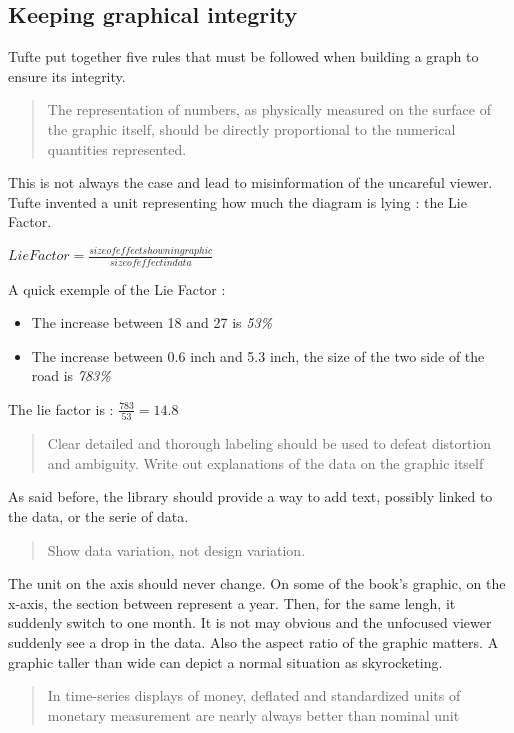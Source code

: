 \subsection{Keeping graphical integrity} 
Tufte put together five rules that must be followed when building a graph to ensure its integrity.

\begin{quote}
The representation of numbers, as physically measured on the surface of the graphic itself, should be directly proportional to the numerical quantities represented.
\end{quote}
This is not always the case and lead to misinformation of the uncareful viewer. Tufte invented a unit representing how much the diagram is lying : the Lie Factor.

$Lie Factor = \frac{size of effect shown in graphic}{size of effect in data}$

A quick exemple of the Lie Factor :


\begin{itemize}
\item The increase between 18 and 27 is \emph{53\%}
\item The increase between 0.6 inch and 5.3 inch, the size of the two side of the road is \emph{783\%}
\end{itemize}

The lie factor is  : $\frac{783}{53} = 14.8$ 

\begin{quote}
Clear detailed and thorough labeling should be used to defeat distortion and ambiguity. Write out explanations of the data on the graphic itself
\end{quote}

As said before, the library should provide a way to add text, possibly linked to the data, or the serie of data.
\begin{quote}
Show data variation, not design variation.
\end{quote}
The unit on the axis should never change. On some of the book's graphic, on the x-axis, the section between represent a year.
Then, for the same lengh, it suddenly switch to one month. It is not may obvious and the unfocused viewer suddenly see a drop in the data. 
Also the aspect ratio of the graphic matters. A graphic taller than wide can depict a normal situation as skyrocketing.

\begin{quote}
In time-series displays of money, deflated and standardized units of monetary measurement are nearly always better than nominal unit
\end{quote}

